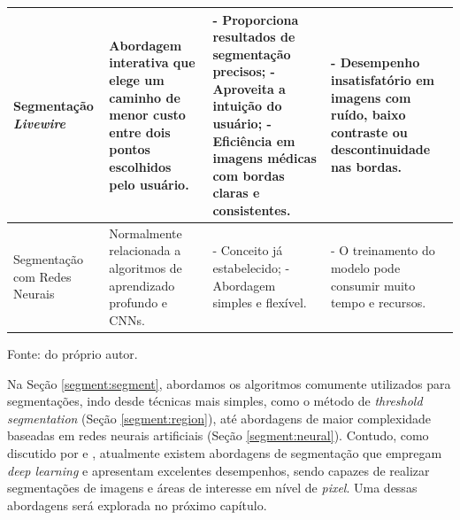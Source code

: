 \begin{landscape}
\begin{table}[p]
{\begin{tabularx}{\linewidth}{l|X|X|X}
        \hline
        Segmentação \textit{Livewire}       & Abordagem interativa que elege um caminho de menor custo entre dois pontos escolhidos pelo usuário.                                                                 & - Proporciona resultados de segmentação precisos; \newline - Aproveita a intuição do usuário; \newline - Eficiência em imagens médicas com bordas claras e consistentes.                                                   & - Desempenho insatisfatório em imagens com ruído, baixo contraste ou descontinuidade nas bordas.                                                                                                    \\
        \hline
        Segmentação com Redes Neurais       & Normalmente relacionada a algoritmos de aprendizado profundo e CNNs.                                                                                               & - Conceito já estabelecido; \newline - Abordagem simples e flexível.                                                                                                                                                    & - O treinamento do modelo pode consumir muito tempo e recursos.                                                                                                                                       \\
        \hline
        
        \end{tabularx}%
    }
    
    \vspace*{1 cm}
    Fonte: do próprio autor.
    \end{table}
\end{landscape}


Na Seção \ref{segment:segment}, abordamos os algoritmos comumente utilizados para segmentações, indo desde técnicas mais simples, como o método de \textit{threshold segmentation} (Seção \ref{segment:region}), até abordagens de maior complexidade baseadas em redes neurais artificiais (Seção \ref{segment:neural}). Contudo, como discutido por \cite{Ghosh2019} e \cite{Minaee2021}, atualmente existem abordagens de segmentação que empregam \textit{deep learning} e apresentam excelentes desempenhos, sendo capazes de realizar segmentações de imagens e áreas de interesse em nível de \textit{pixel}. Uma dessas abordagens será explorada no próximo capítulo.
